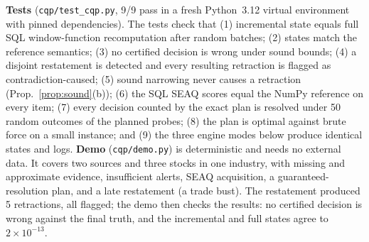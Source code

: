 \documentclass[conference]{IEEEtran}
\newcommand{\seaq}{SEAQ\xspace}
\begin{document}
\textbf{Tests} (\texttt{cqp/test\_cqp.py}, 9/9 pass in a fresh Python~3.12 virtual environment with pinned
dependencies). The tests check that (1) incremental state equals full SQL window-function recomputation after random
batches; (2) states match the reference semantics; (3) no certified decision is wrong under sound bounds; (4) a
disjoint restatement is detected and every resulting retraction is flagged as contradiction-caused; (5) sound
narrowing never causes a retraction (Prop.~\ref{prop:sound}(b)); (6) the SQL \seaq{} scores equal the NumPy
reference on every item; (7) every decision counted by the exact plan is resolved under 50 random outcomes of the
planned probes; (8) the plan is optimal against brute force on a small instance; and (9) the three engine modes below produce
identical states and logs. \textbf{Demo}
(\texttt{cqp/demo.py}) is deterministic and needs no external data. It covers two sources and three stocks in one
industry, with missing and approximate evidence, insufficient alerts, \seaq{} acquisition, a guaranteed-resolution
plan, and a late restatement (a trade bust). The restatement produced 5 retractions, all flagged; the demo then
checks the results: no certified decision is wrong against the final truth, and the incremental and full states
agree to $2\times10^{-13}$.
\end{document}
